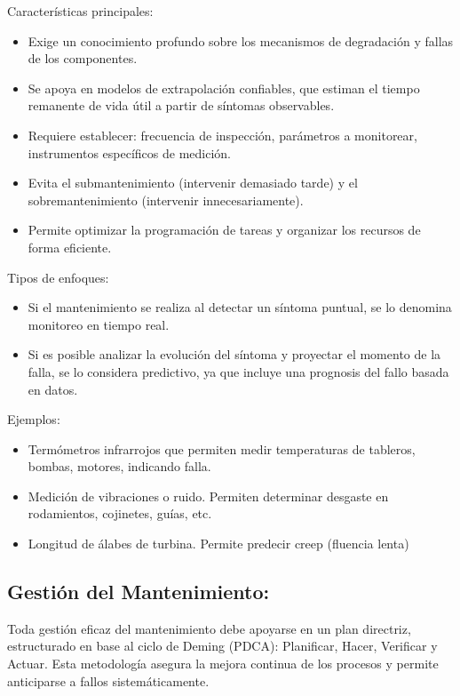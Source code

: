\documentclass[a4paper,oneside,11pt]{article}
\begin{document}
\begin{enumerate}
    Características principales:
    \begin{itemize}
        \item Exige un conocimiento profundo sobre los mecanismos de degradación y fallas de los componentes.
        \item Se apoya en modelos de extrapolación confiables, que estiman el tiempo remanente de vida útil a partir de síntomas observables.
        \item Requiere establecer: frecuencia de inspección, parámetros a monitorear, instrumentos específicos de medición.
        \item Evita el submantenimiento (intervenir demasiado tarde) y el sobremantenimiento (intervenir innecesariamente).
        \item Permite optimizar la programación de tareas y organizar los recursos de forma eficiente.
    \end{itemize}

    Tipos de enfoques: 
    \begin{itemize}
        \item Si el mantenimiento se realiza al detectar un síntoma puntual, se lo denomina monitoreo en tiempo real.
        \item Si es posible analizar la evolución del síntoma y proyectar el momento de la falla, se lo considera predictivo, ya que incluye una prognosis del fallo basada en datos.
    \end{itemize}

    Ejemplos: 
    \begin{itemize}
        \item Termómetros infrarrojos que permiten medir temperaturas de tableros, bombas, motores, indicando falla.
        \item Medición de vibraciones o ruido. Permiten determinar desgaste en rodamientos, cojinetes, guías, etc.
        \item Longitud de álabes de turbina. Permite predecir creep (fluencia lenta)
    \end{itemize}

\end{enumerate}


\subsection{Gestión del Mantenimiento:}

Toda gestión eficaz del mantenimiento debe apoyarse en un plan directriz, estructurado en base al ciclo de Deming (PDCA): Planificar, Hacer, Verificar y Actuar. Esta metodología asegura la mejora continua de los procesos y permite anticiparse a fallos sistemáticamente.
\end{document}
